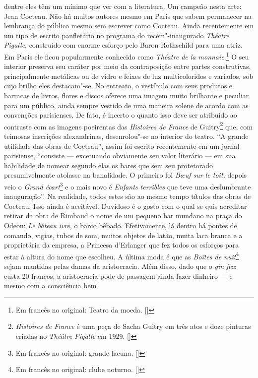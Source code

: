 dentre eles têm um mínimo que ver com a literatura. Um campeão nesta
arte: Jean Cocteau. Não há muitos autores mesmo em Paris que sabem
permanecer na lembrança do público mesmo sem escrever como Cocteau.
Ainda recentemente em um tipo de escrito panfletário no programa do
recém"-inaugurado \emph{Théatre Pigalle}, construído com enorme esforço
pelo Baron Rothschild para uma atriz. Em Paris ele ficou popularmente
conhecido como \emph{Théatre de la monnaie}.\footnote{Em francês no original: Teatro da moeda. []} O seu interior preserva seu caráter
por meio da contraposição entre partes construtivas, principalmente
metálicas ou de vidro e feixes de luz multicoloridos e variados, sob
cujo brilho eles destacam"-se. No entreato, o vestíbulo com seus produtos
e barracas de livros, flores e discos oferece uma imagem muito brilhante
e peculiar para um público, ainda sempre vestido de uma maneira solene
de acordo com as convenções parisienses. De fato, é incerto o quanto
isso deve ser atribuído ao contraste com as imagens poeirentas das
\emph{Histoires de France} de Guitry\footnote{\emph{Histoires de
  France} é uma peça de Sacha Guitry em três atos e doze pinturas
  criadas no \emph{Théâtre Pigalle} em 1929. []} que, com teimosas
inscrições alexandrinas, desenrolou"-se no interior do teatro. ``A grande
utilidade das obras de Cocteau'', assim foi escrito recentemente em um
jornal parisiense, ``consiste --- excetuando obviamente seu valor
literário --- em sua habilidade de nomear segundo elas os bares que sem
seu protetorado presumivelmente atolasse na banalidade. O primeiro foi
\emph{Bœuf sur le toit,} depois veio o \emph{Grand écart}\footnote{Em francês no original: grande lacuna. []} e o mais novo é
\emph{Enfants terribles} que teve uma deslumbrante inauguração''. Na
realidade, todos estes são ao mesmo tempo títulos das obras de Cocteau.
Isso ainda é aceitável. Duvidoso é o gosto com o qual se quis acreditar
retirar da obra de Rimbaud o nome de um pequeno bar mundano na praça do
Odeon: \emph{Le bâteau ivre}, o barco bêbado. Efetivamente, lá dentro há
pontes de comando, vigias, tubos de som, muitos objetos de latão, muita
laca branca e a proprietária da empresa, a Princesa d'Erlanger que fez
todos os esforços para estar à altura do nome que escolheu. A última
moda é que as \emph{Boîtes de nuit}\footnote{Em francês no original: clube noturno. []} sejam mantidas pelas damas da aristocracia.
Além disso, dado que o \emph{gin fizz} custa 20 francos, a aristocracia
pode de passagem ainda fazer dinheiro --- e mesmo com a consciência bem
